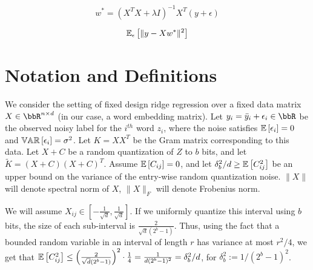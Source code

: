 \documentclass[12pt]{article}
\newcommand{\eps}{\epsilon}
\newcommand{\by}{\bar{y}}
\newcommand{\tK}{\tilde{K}}
\newcommand{\defeq}{:=}
\begin{document}

$$w^* = (X^T X + \lambda I)^{-1}X^T (y+\eps)$$

$$\expect{\eps}{\|y - Xw^*\|^2}$$


\section{Notation and Definitions}
We consider the setting of fixed design ridge regression over a fixed data matrix $X \in \RR^{n\times d}$ (in our case, a word embedding matrix). Let $y_i = \by_i + \eps_i \in \RR$ be the observed noisy label for the $i^{th}$ word $z_i$, where the noise satisfies $\expect{}{\eps_i} = 0$ and $\var{}{\eps_i} = \sigma^2$.  Let $K = XX^T$ be the Gram matrix corresponding to this data.  Let $X+C$ be a random quantization of $Z$ to $b$ bits, and let $\tK = (X+C)(X+C)^T$. Assume $\expect{}{C_{ij}} = 0$, and let $\delta_b^2/d \geq \expect{}{C_{ij}^2}$ be an upper bound on the variance of the entry-wise random quantization noise.  $\|X\|$ will denote spectral norm of $X$, $\|X\|_F$ will denote Frobenius norm.

We will assume $X_{ij} \in [-\frac{1}{\sqrt{d}},\frac{1}{\sqrt{d}}]$.  If we uniformly quantize this interval using $b$ bits, the size of each sub-interval is $\frac{2}{\sqrt{d}(2^b-1)}$.  Thus, using the fact that a bounded random variable in an interval of length $r$ has variance at most $r^2/4$, we get that $\expect{}{C_{ij}^2} \leq \Big(\frac{2}{\sqrt{d}(2^b-1)}\Big)^2\cdot \frac{1}{4} = \frac{1}{d(2^b-1)^2} = \delta_b^2/d$, for $\delta_b^2 \defeq 1/(2^b-1)^2$.

 
%

\end{document}
